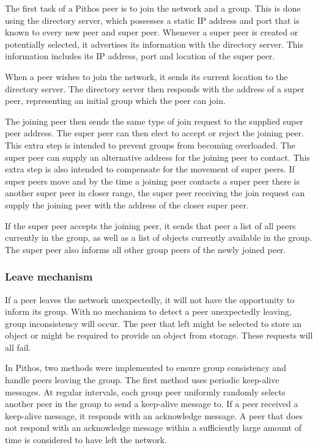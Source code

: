 The first task of a Pithos peer is to join the network and a group. This is done using the directory server, which possesses a static IP address and port that is known to every new peer and super peer. Whenever a super peer is created or potentially selected, it advertises its information with the directory server. This information includes its IP address, port and location of the super peer.

When a peer wishes to join the network, it sends its current location to the directory server. The directory server then responds with the address of a super peer, representing an initial group which the peer can join.

The joining peer then sends the same type of join request to the supplied super peer address. The super peer can then elect to accept or reject the joining peer. This extra step is intended to prevent groups from becoming overloaded. The super peer can supply an alternative address for the joining peer to contact. This extra step is also intended to compensate for the movement of super peers. If super peers move and by the time a joining peer contacts a super peer there is another super peer in closer range, the super peer receiving the join request can supply the joining peer with the address of the closer super peer.

If the super peer accepts the joining peer, it sends that peer a list of all peers currently in the group, as well as a list of objects currently available in the group. The super peer also informs all other group peers of the newly joined peer.

\subsubsection{Leave mechanism}

If a peer leaves the network unexpectedly, it will not have the opportunity to inform its group. With no mechanism to detect a peer unexpectedly leaving, group inconsistency will occur. The peer that left might be selected to store an object or might be required to provide an object from storage. These requests will all fail.

In Pithos, two methods were implemented to ensure group consistency and handle peers leaving the group. The first method uses periodic keep-alive messages. At regular intervals, each group peer uniformly randomly selects another peer in the group to send a keep-alive message to. If a peer received a keep-alive message, it responds with an acknowledge message. A peer that does not respond with an acknowledge message within a sufficiently large amount of time is considered to have left the network.

